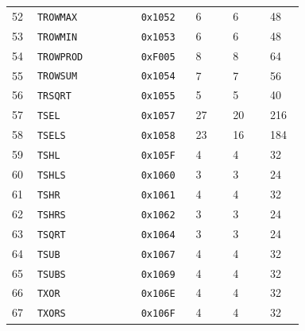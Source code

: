 {\begin{longtable}{@{}R{0.045\linewidth}L{0.29\linewidth}L{0.12\linewidth}R{0.10\linewidth}R{0.10\linewidth}R{0.08\linewidth}@{}}
52 & \texttt{TROWMAX} & \texttt{0x1052} & 6 & 6 & 48 \\
53 & \texttt{TROWMIN} & \texttt{0x1053} & 6 & 6 & 48 \\
54 & \texttt{TROWPROD} & \texttt{0xF005} & 8 & 8 & 64 \\
55 & \texttt{TROWSUM} & \texttt{0x1054} & 7 & 7 & 56 \\
56 & \texttt{TRSQRT} & \texttt{0x1055} & 5 & 5 & 40 \\
57 & \texttt{TSEL} & \texttt{0x1057} & 27 & 20 & 216 \\
58 & \texttt{TSELS} & \texttt{0x1058} & 23 & 16 & 184 \\
59 & \texttt{TSHL} & \texttt{0x105F} & 4 & 4 & 32 \\
60 & \texttt{TSHLS} & \texttt{0x1060} & 3 & 3 & 24 \\
61 & \texttt{TSHR} & \texttt{0x1061} & 4 & 4 & 32 \\
62 & \texttt{TSHRS} & \texttt{0x1062} & 3 & 3 & 24 \\
63 & \texttt{TSQRT} & \texttt{0x1064} & 3 & 3 & 24 \\
64 & \texttt{TSUB} & \texttt{0x1067} & 4 & 4 & 32 \\
65 & \texttt{TSUBS} & \texttt{0x1069} & 4 & 4 & 32 \\
66 & \texttt{TXOR} & \texttt{0x106E} & 4 & 4 & 32 \\
67 & \texttt{TXORS} & \texttt{0x106F} & 4 & 4 & 32 \\
\bottomrule
\end{longtable}
}

